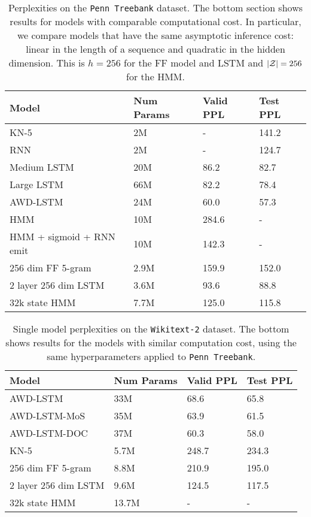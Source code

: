 \documentclass[11pt,a4paper]{article}
\begin{document}
\begin{table*}[!t]
\centering
\begin{tabular}{llll}
\toprule
Model & Num Params & Valid PPL & Test PPL\\
\midrule
KN-5 \citep{mikolov2012rnn}  & 2M & - & 141.2\\
RNN \citep{mikolov2012rnn}  & 2M & - & 124.7\\
Medium LSTM \citep{zaremba2014lstm} & 20M & 86.2 & 82.7\\
Large LSTM \citep{zaremba2014lstm} & 66M & 82.2 & 78.4\\
AWD-LSTM \citep{merity2017awdlstm} & 24M & 60.0 & 57.3\\
HMM \citep{buys2018hmm} & 10M & 284.6 & -\\
HMM + sigmoid + RNN emit \citep{buys2018hmm} & 10M & 142.3 & -\\
\midrule
256 dim FF 5-gram  & 2.9M     & 159.9      & 152.0  \\
2 layer 256 dim LSTM  & 3.6M     & 93.6       & 88.8   \\
32k state HMM   & 7.7M     & 125.0      & 115.8  \\
\bottomrule
\end{tabular}
\caption{\label{tbl:ptb-ppl}
Perplexities on the \texttt{Penn Treebank} dataset.
The bottom section shows results for models 
with comparable computational cost.
In particular, we compare models that have the same 
asymptotic inference cost: linear in
the length of a sequence and quadratic in the hidden
dimension.
This is $h=256$ for the FF model and LSTM
and $|\mathcal{Z}| = 256$ for the HMM.
}
\end{table*}

\begin{table*}[!t]
\centering
\begin{tabular}{llll}
\toprule
Model & Num Params & Valid PPL & Test PPL\\
\midrule
AWD-LSTM \citep{merity2017awdlstm} & 33M & 68.6 & 65.8\\
AWD-LSTM-MoS \citep{mos} & 35M & 63.9 & 61.5\\
AWD-LSTM-DOC \citep{awddoc} & 37M & 60.3 & 58.0\\
KN-5              & 5.7M       & 248.7 & 234.3\\
\midrule
256 dim FF 5-gram        & 8.8M    & 210.9  & 195.0\\
2 layer 256 dim LSTM     & 9.6M    & 124.5  & 117.5\\
32k state HMM            & 13.7M   & -      & -\\
\bottomrule
\end{tabular}
\caption{\label{tbl:wt2-ppl}
Single model perplexities on the \texttt{Wikitext-2} dataset.
The bottom shows results for the models with 
similar computation cost, using the same
hyperparameters applied to \texttt{Penn Treebank}.
}
\end{table*}
\end{document}
